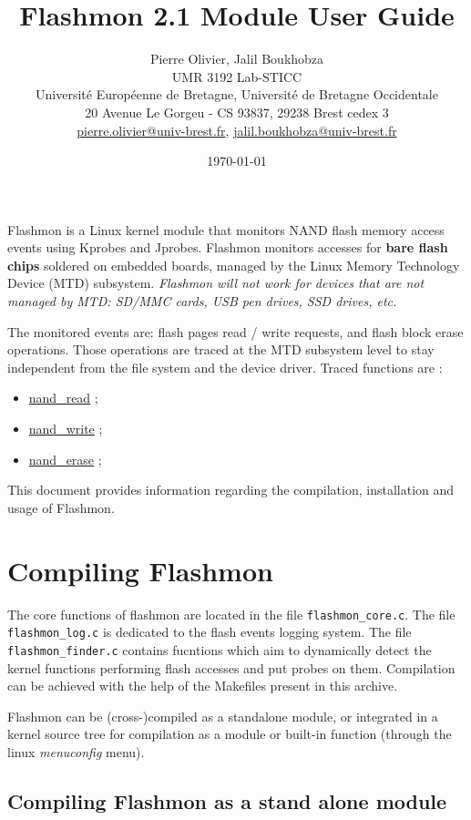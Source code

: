 \documentclass[11pt]{article}
\title{\textbf{Flashmon 2.1 Module User Guide}}
\author{Pierre Olivier, Jalil Boukhobza\\UMR 3192 Lab-STICC\\Universit\'e Europ\'eenne de Bretagne, Universit\'e de Bretagne Occidentale\\20 Avenue Le Gorgeu - CS 93837, 29238 Brest cedex 3\\\href{mailto:pierre.olivier@univ-brest.fr}{pierre.olivier@univ-brest.fr}, \href{mailto:jalil.boukhobza@univ-brest.fr}{jalil.boukhobza@univ-brest.fr}}
\date{\today}
\begin{document}
\VerbatimFootnotes

\maketitle

Flashmon is a Linux kernel module that monitors NAND flash memory access events using Kprobes and Jprobes. Flashmon monitors accesses for \textbf{bare flash chips} soldered on embedded boards, managed by the Linux Memory Technology Device (MTD) subsystem. \textit{Flashmon will not work for devices that are not managed by MTD: SD/MMC cards, USB pen drives, SSD drives, etc.}

The monitored events are: flash pages read / write requests, and flash block erase operations. Those operations are traced at the MTD subsystem level to stay independent from the file system and the device driver. Traced functions are :

\begin{itemize}[itemsep=0.01pt]
	\item \href{http://lxr.free-electrons.com/ident?i=nand_read}{nand\_read} ;
	\item \href{http://lxr.free-electrons.com/ident?i=nand_write}{nand\_write} ;
	\item \href{http://lxr.free-electrons.com/ident?i=nand_erase}{nand\_erase} ;
\end{itemize}

This document provides information regarding the compilation, installation and usage of Flashmon.

\section{Compiling Flashmon}

	The core functions of flashmon are located in the file \verb+flashmon_core.c+. The file \verb+flashmon_log.c+ is dedicated to the flash events logging system. The file \verb+flashmon_finder.c+ contains fucntions which aim to dynamically detect the kernel functions performing flash accesses and put probes on them. Compilation can be achieved with the help of the Makefiles present in this archive.
	
	Flashmon can be (cross-)compiled as a standalone module, or integrated in a kernel source tree for compilation as a module or built-in function (through the linux \emph{menuconfig} menu).
	
	\subsection{Compiling Flashmon as a stand alone module}
\end{document}
